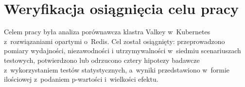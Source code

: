 \section{Weryfikacja osiągnięcia celu pracy}

Celem pracy była analiza porównawcza klastra Valkey w~Kubernetes z~rozwiązaniami opartymi o~Redis. Cel został osiągnięty: przeprowadzono pomiary wydajności, niezawodności i utrzymywalności w~siedmiu scenariuszach testowych, potwierdzono lub odrzucono cztery hipotezy badawcze z~wykorzystaniem testów statystycznych, a~wyniki przedstawiono w~formie ilościowej z~podaniem p-wartości i~wielkości efektu.